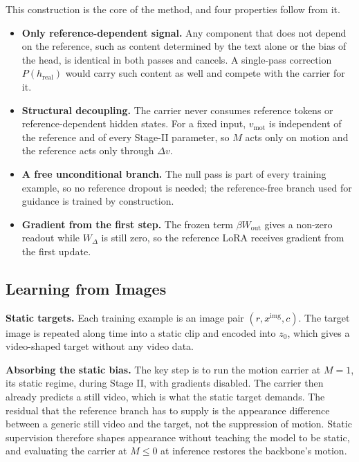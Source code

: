 This construction is the core of the method, and four properties follow from it.

\begin{itemize}
  \item \textbf{Only reference-dependent signal.} Any component that does not depend on the reference, such as content determined by the text alone or the bias of the head, is identical in both passes and cancels. A single-pass correction $P(h_{\mathrm{real}})$ would carry such content as well and compete with the carrier for it.
  \item \textbf{Structural decoupling.} The carrier never consumes reference tokens or reference-dependent hidden states. For a fixed input, $v_{\mathrm{mot}}$ is independent of the reference and of every Stage-II parameter, so $M$ acts only on motion and the reference acts only through $\Delta v$.
  \item \textbf{A free unconditional branch.} The null pass is part of every training example, so no reference dropout is needed; the reference-free branch used for guidance is trained by construction.
  \item \textbf{Gradient from the first step.} The frozen term $\beta W_{\mathrm{out}}$ gives a non-zero readout while $W_\Delta$ is still zero, so the reference LoRA receives gradient from the first update.
\end{itemize}

\subsection{Learning from Images}
\label{sec:3_5}

\textbf{Static targets.} Each training example is an image pair $(r, x^{\mathrm{img}}, c)$. The target image is repeated along time into a static clip and encoded into $z_0$, which gives a video-shaped target without any video data.

\textbf{Absorbing the static bias.} The key step is to run the motion carrier at $M{=}1$, its static regime, during Stage II, with gradients disabled. The carrier then already predicts a still video, which is what the static target demands. The residual that the reference branch has to supply is the appearance difference between a generic still video and the target, not the suppression of motion. Static supervision therefore shapes appearance without teaching the model to be static, and evaluating the carrier at $M{\le}0$ at inference restores the backbone's motion.

